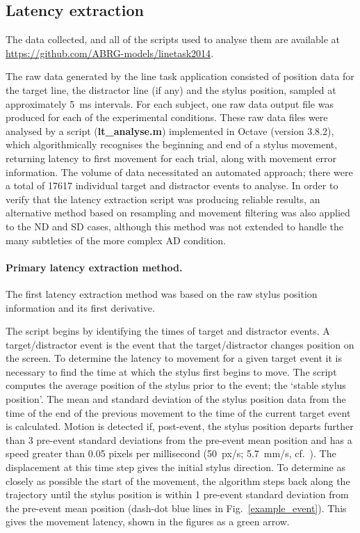 \documentclass[10pt,letterpaper]{article}
\newcommand{\filename}[1]{\textsf{\textbf{#1}}}
\begin{document}
\subsection*{Latency extraction}
The data collected, and all of the scripts used to analyse them are
available at \url{https://github.com/ABRG-models/linetask2014}.

The raw data generated by the line task application consisted of
position data for the target line, the distractor line (if any) and
the stylus position, sampled at approximately 5~ms intervals. For each
subject, one raw data output file was produced for each of the
experimental conditions.  These raw data files were analysed by a
script (\filename{lt\_analyse.m}) implemented in Octave (version
3.8.2), which algorithmically recognises the beginning and end of a
stylus movement, returning latency to first movement for each trial,
along with movement error information. The volume of data necessitated
an automated approach; there were a total of 17617 individual target
and distractor events to analyse. In order to verify that the latency
extraction script was producing reliable results, an alternative
method based on resampling and movement filtering was also applied to
the ND and SD cases, although this method was not extended to handle
the many subtleties of the more complex AD condition.

\paragraph{Primary latency extraction method.} The first latency extraction
method was based on the raw stylus position information and its first
derivative.

The script begins by identifying the times of target and distractor
events. A target/distractor event is the event that the
target/distractor changes position on the screen. To determine the
latency to movement for a given target event it is necessary to find
the time at which the stylus first begins to move. The script computes
the average position of the stylus prior to the event; the `stable
stylus position'. The mean and standard deviation of the stylus
position data from the time of the end of the previous movement to the
time of the current target event is calculated.  Motion is detected
if, post-event, the stylus position departs further than 3 pre-event
standard deviations from the pre-event mean position and has a speed
greater than 0.05 pixels per millisecond (50~px/s; 5.7~mm/s,
cf.~\cite{prablanc_optimal_1979}).  The displacement at this time step
gives the initial stylus direction. To determine as closely as
possible the start of the movement, the algorithm steps back along the
trajectory until the stylus position is within 1 pre-event standard
deviation from the pre-event mean position (dash-dot blue lines in
Fig.~\ref{example_event}). This gives the movement latency, shown in
the figures as a green arrow.
\end{document}
